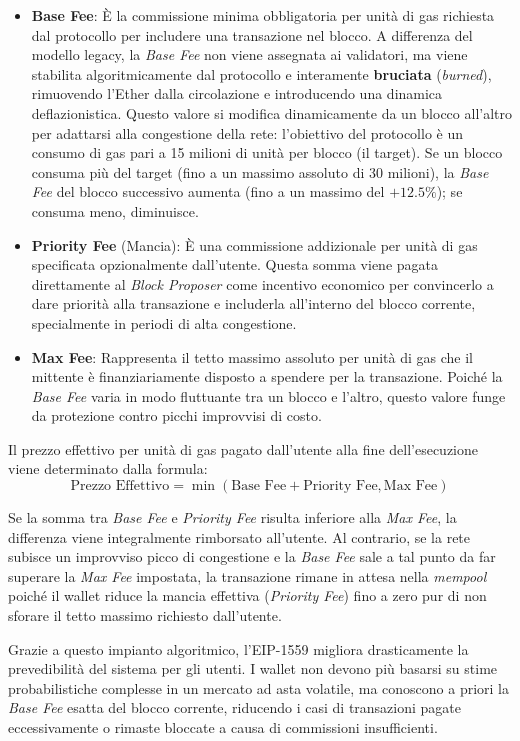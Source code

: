 \begin{itemize}
    \item \textbf{Base Fee}: È la commissione minima obbligatoria per unità di gas richiesta dal protocollo per includere una transazione nel blocco. A differenza del modello legacy, la \textit{Base Fee} non viene assegnata ai validatori, ma viene stabilita algoritmicamente dal protocollo e interamente \textbf{bruciata} (\textit{burned}), rimuovendo l'Ether dalla circolazione e introducendo una dinamica deflazionistica. Questo valore si modifica dinamicamente da un blocco all'altro per adattarsi alla congestione della rete: l'obiettivo del protocollo è un consumo di gas pari a 15 milioni di unità per blocco (il target). Se un blocco consuma più del target (fino a un massimo assoluto di 30 milioni), la \textit{Base Fee} del blocco successivo aumenta (fino a un massimo del $+12.5\%$); se consuma meno, diminuisce.
    \item \textbf{Priority Fee} (Mancia): È una commissione addizionale per unità di gas specificata opzionalmente dall'utente. Questa somma viene pagata direttamente al \textit{Block Proposer} come incentivo economico per convincerlo a dare priorità alla transazione e includerla all'interno del blocco corrente, specialmente in periodi di alta congestione.
    \item \textbf{Max Fee}: Rappresenta il tetto massimo assoluto per unità di gas che il mittente è finanziariamente disposto a spendere per la transazione. Poiché la \textit{Base Fee} varia in modo fluttuante tra un blocco e l'altro, questo valore funge da protezione contro picchi improvvisi di costo. 
\end{itemize}

Il prezzo effettivo per unità di gas pagato dall'utente alla fine dell'esecuzione viene determinato dalla formula:
\[\text{Prezzo Effettivo} = \min(\text{Base Fee} + \text{Priority Fee}, \text{Max Fee})\]

Se la somma tra \textit{Base Fee} e \textit{Priority Fee} risulta inferiore alla \textit{Max Fee}, la differenza viene integralmente rimborsato all'utente. 
Al contrario, se la rete subisce un improvviso picco di congestione e la \textit{Base Fee} sale a tal punto da far superare la \textit{Max Fee} impostata, la transazione rimane in attesa nella \textit{mempool} poiché il wallet riduce la mancia effettiva (\textit{Priority Fee}) fino a zero pur di non sforare il tetto massimo richiesto dall'utente.

Grazie a questo impianto algoritmico, l'EIP-1559 migliora drasticamente la prevedibilità del sistema per gli utenti. I wallet non devono più basarsi su stime probabilistiche complesse in un mercato ad asta volatile, ma conoscono a priori la \textit{Base Fee} esatta del blocco corrente, riducendo i casi di transazioni pagate eccessivamente o rimaste bloccate a causa di commissioni insufficienti.